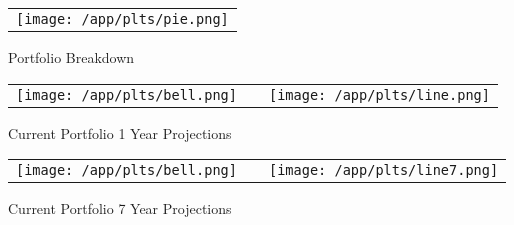 \documentclass{article}
\begin{document}
\begin{adjustwidth}{-.3in}{0in}%
\vspace*{-1cm}

\begin{center}
  \begin{tabular}{c}
    \texttt{[image: /app/plts/pie.png]}
  \end{tabular}
  \end{center}

  \begin{center}
        Portfolio Breakdown
  \end{center}

\vspace{.7cm}


\begin{center}
  \begin{tabular}{lcr}
  \texttt{[image: /app/plts/bell.png]}
    & \hspace{1cm }&\texttt{[image: /app/plts/line.png]}
  \end{tabular}
  \end{center}

  \begin{center}
      Current Portfolio 1 Year Projections
  \end{center}

  \vspace{.7cm}


\begin{center}
  \begin{tabular}{lcr}
  \texttt{[image: /app/plts/bell.png]}
    & \hspace{1cm }&\texttt{[image: /app/plts/line7.png]}
  \end{tabular}
  \end{center}

  \begin{center}
      Current Portfolio 7 Year Projections
  \end{center}

 \vspace{.6cm}

\end{adjustwidth}
\end{document}
